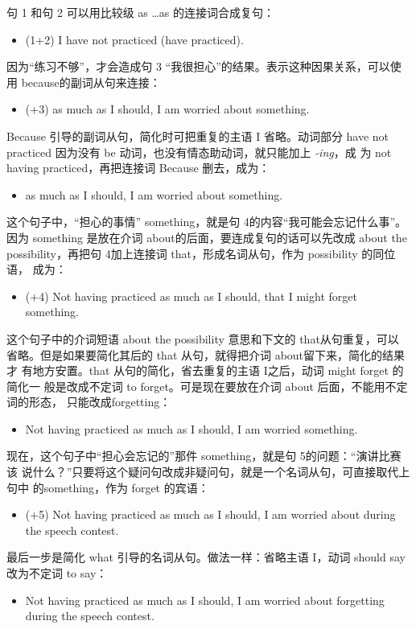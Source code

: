 句 1 和句 2 可以用比较级 as \ldots as 的连接词合成复句：
\begin{itemize}
\item (1+2) I have not practiced  (have practiced).
\end{itemize}
因为“练习不够”，才会造成句 3 “我很担心”的结果。表示这种因果关系，可以使
用 because的副词从句来连接：
\begin{itemize}
\item (+3)  as much as I should, I am
  worried about something.
\end{itemize}
Because 引导的副词从句，简化时可把重复的主语 I 省略。动词部分 have not
practiced 因为没有 be 动词，也没有情态助动词，就只能加上 \emph{-ing}，成
为 not having practiced，再把连接词 Because 删去，成为：
\begin{itemize}
\item {} as much as I should, I am worried about something.
\end{itemize}
这个句子中，“担心的事情” something，就是句 4的内容“我可能会忘记什么事”。
因为 something 是放在介词 about的后面，要连成复句的话可以先改成 about the
possibility，再把句 4加上连接词 that，形成名词从句，作为 possibility 的同位语，
成为：
\begin{itemize}
\item (+4) Not having practiced as much as I should,  that I might forget something.
\end{itemize}
这个句子中的介词短语 about the possibility 意思和下文的 that从句重复，可以
省略。但是如果要简化其后的 that 从句，就得把介词 about留下来，简化的结果才
有地方安置。that 从句的简化，省去重复的主语 I之后，动词 might forget 的简化一
般是改成不定词 to forget。可是现在要放在介词 about 后面，不能用不定词的形态，
只能改成forgetting：
\begin{itemize}
\item Not having practiced as much as I should, I am worried 
  something.
\end{itemize}
现在，这个句子中“担心会忘记的”那件 something，就是句 5的问题：“演讲比赛该
说什么？”只要将这个疑问句改成非疑问句，就是一个名词从句，可直接取代上句中
的something，作为 forget 的宾语：
\begin{itemize}
\item (+5) Not having practiced as much as I should, I am worried about
   during the speech contest.
\end{itemize}
最后一步是简化 what 引导的名词从句。做法一样：省略主语 I，动词 should
say 改为不定词 to say：
\begin{itemize}
\item Not having practiced as much as I should, I am worried about forgetting
   during the speech contest.
\end{itemize}

